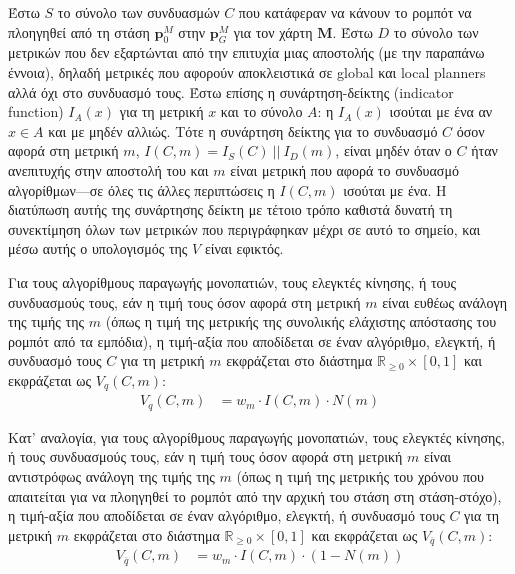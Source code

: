 Έστω $S$ το σύνολο των συνδυασμών $C$ που κατάφεραν να κάνουν το ρομπότ να
πλοηγηθεί από τη στάση $\bm{p}_0^M$ στην $\bm{p}_G^M$ για τον χάρτη $\bm{M}$.
Έστω $D$ το σύνολο των μετρικών που δεν εξαρτώνται από την επιτυχία μιας
αποστολής (με την παραπάνω έννοια), δηλαδή μετρικές που αφορούν αποκλειστικά σε
global και local planners αλλά όχι στο συνδυασμό τους. Έστω επίσης η
συνάρτηση-δείκτης (indicator function) $I_A(x)$ για τη μετρική $x$ και το
σύνολο $A$: η $I_A(x)$ ισούται με ένα αν $x \in A$ και με μηδέν αλλιώς. Τότε η
συνάρτηση δείκτης για το συνδυασμό $C$ όσον αφορά στη μετρική $m$,
$I(C,m) = I_S(C)\ ||\ I_D(m)$, είναι μηδέν όταν ο $C$ ήταν ανεπιτυχής στην
αποστολή του και $m$ είναι μετρική που αφορά το συνδυασμό αλγορίθμων---σε
όλες τις άλλες περιπτώσεις η $I(C,m)$ ισούται με ένα. Η διατύπωση αυτής της
συνάρτησης δείκτη με τέτοιο τρόπο καθιστά δυνατή τη συνεκτίμηση όλων των
μετρικών που περιγράφηκαν μέχρι σε αυτό το σημείο, και μέσω αυτής ο υπολογισμός
της $V$ είναι εφικτός.

Για τους αλγορίθμους παραγωγής μονοπατιών, τους ελεγκτές κίνησης, ή τους
συνδυασμούς τους, εάν η τιμή τους όσον αφορά στη μετρική $m$ είναι ευθέως
ανάλογη της τιμής της $m$ (όπως η τιμή της μετρικής της συνολικής ελάχιστης
απόστασης του ρομπότ από τα εμπόδια), η τιμή-αξία που αποδίδεται σε έναν
αλγόριθμο, ελεγκτή, ή συνδυασμό τους $C$ για τη μετρική $m$ εκφράζεται στο
διάστημα $\mathbb{R}_{\ge 0} \times [0,1]$ και εκφράζεται ως $V_q(C,m)$:
\begin{align}
  \label{eq:V_proportional}
  V_q(C,m) &=  w_m \cdot I(C,m) \cdot N(m)
\end{align}

Κατ' αναλογία, για τους αλγορίθμους παραγωγής μονοπατιών, τους ελεγκτές
κίνησης, ή τους συνδυασμούς τους, εάν η τιμή τους όσον αφορά στη μετρική $m$
είναι αντιστρόφως ανάλογη της τιμής της $m$ (όπως η τιμή της μετρικής του
χρόνου που απαιτείται για να πλοηγηθεί το ρομπότ από την αρχική του στάση
στη στάση-στόχο), η τιμή-αξία που αποδίδεται σε έναν αλγόριθμο, ελεγκτή, ή
συνδυασμό τους $C$ για τη μετρική $m$ εκφράζεται στο διάστημα $\mathbb{R}_{\ge
0} \times [0,1]$ και εκφράζεται ως $V_{\overline{q}}(C,m)$:
\begin{align}
  \label{eq:V_inversely_proportional}
  V_{\overline{q}}(C,m) &=  w_m \cdot I(C,m) \cdot(1 - N(m))
\end{align}

